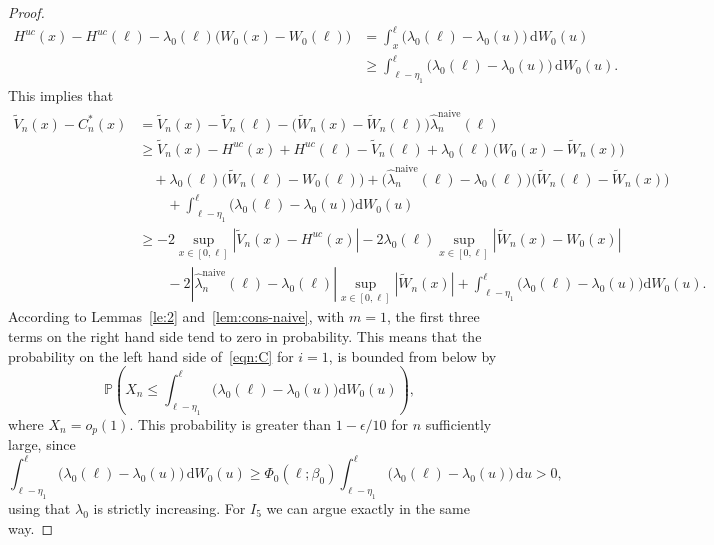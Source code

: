 \documentclass[11pt,reqno]{amsart}
\theoremstyle{definition}
\theoremstyle{plain}
\theoremstyle{remark}
\begin{document}
\begin{proof}
\[
\begin{split}
H^{uc}(x)-H^{uc}(\ell)-\lambda_0(\ell)\big(W_0(x)-W_0(\ell)\big)
&=
\int_x^{\ell} \big(\lambda_0(\ell)-\lambda_0(u)\big)\,\mathrm{d}W_0(u)\\
&\geq
\int_{\ell-\eta_1}^{\ell}
\big(\lambda_0(\ell)-\lambda_0(u)\big)\,\mathrm{d}W_0(u).
\end{split}
\]
This implies that
\[
\begin{split}
\tilde V_n(x)-C^*_n(x)
&=
\tilde V_n(x)-
\tilde V_n(\ell)-\big(\tilde W_n(x)-\tilde W_n(\ell)\big)\hat{\lambda}_n^{\mathrm{naive}}(\ell)\\
&\geq
\tilde V_n(x)-H^{uc}(x)+H^{uc}(\ell)-\tilde V_n(\ell)+\lambda_0(\ell)\big(W_0(x)-\tilde W_n(x)\big)\\
&\quad+
\lambda_0(\ell)\big(\tilde W_n(\ell)-W_0(\ell)\big)
+
\big(\hat{\lambda}_n^{\mathrm{naive}}(\ell)-\lambda_0(\ell)\big)\big(\tilde W_n(\ell)-\tilde W_n(x)\big)\\
&\qquad+
\int_{\ell-\eta_1}^{\ell}\big(\lambda_0(\ell)-\lambda_0(u)\big)\mathrm{d}W_0(u)\\
&\geq
-2\sup_{x\in[0,\ell]}|\tilde V_n(x)-H^{uc}(x)|
-2\lambda_0(\ell)\sup_{x\in[0,\ell]}|\tilde W_n(x)-W_0(x)|\\
&\qquad-
2|\hat{\lambda}_n^{\mathrm{naive}}(\ell)-\lambda_0(\ell)|\sup_{x\in[0,\ell]}|\tilde W_n(x)|
+
\int_{\ell-\eta_1}^{\ell}\big(\lambda_0(\ell)-\lambda_0(u)\big)\mathrm{d}W_0(u).
\end{split}
\]
According to Lemmas~\ref{le:2} and~\ref{lem:cons-naive}, with $m=1$, the first three terms on the right hand side tend to zero in probability.
This means that the probability on the left hand side of~\eqref{eqn:C} for $i=1$, is bounded
from below by
\[
{\mathbb{P}}
\left(
X_n\leq \int_{\ell-\eta_1}^\ell\big(\lambda_0(\ell)-\lambda_0(u)\big)\mathrm{d}W_0(u)
\right),
\]
where $X_n=o_p(1)$.
This probability is greater than $1-\epsilon/10$ for $n$ sufficiently large, since
\[
\int_{\ell-\eta_1}^\ell\big(\lambda_0(\ell)-\lambda_0(u)\big)\,\mathrm{d}W_0(u)
\geq
\Phi_0(\ell;\beta_0)
\int_{\ell-\eta_1}^\ell\big(\lambda_0(\ell)-\lambda_0(u)\big)\,\mathrm{d}u
>0,
\]
using that $\lambda_0$ is strictly increasing.
For $I_5$ we can argue exactly in the same way.
\end{proof}
\end{document}
